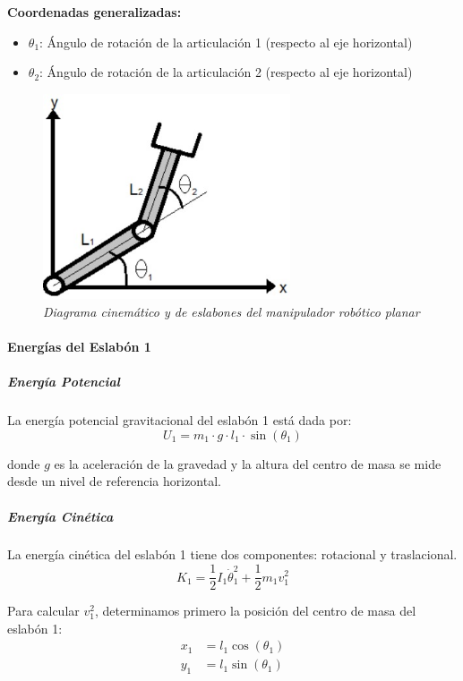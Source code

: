 \textbf{Coordenadas generalizadas:}
\begin{itemize}
    \item $\theta_1$: Ángulo de rotación de la articulación 1 (respecto al eje horizontal)
    \item $\theta_2$: Ángulo de rotación de la articulación 2 (respecto al eje horizontal)
\end{itemize}
\begin{figure}[H]
    \centering
    \includegraphics[width=0.65\textwidth]{img/DCL_brazo.png}
    \caption{\textit{Diagrama cinemático y de eslabones del manipulador robótico planar}}
    \label{fig:DCL_brazo}
\end{figure}
\paragraph{Energías del Eslabón 1}

\subparagraph{Energía Potencial}

La energía potencial gravitacional del eslabón 1 está dada por:
\begin{equation}
U_1 = m_1 \cdot g \cdot l_1 \cdot \sin(\theta_1)
\end{equation}

donde $g$ es la aceleración de la gravedad y la altura del centro de masa se mide desde un nivel de referencia horizontal.

\subparagraph{Energía Cinética}

La energía cinética del eslabón 1 tiene dos componentes: rotacional y traslacional.
\begin{equation}
K_1 = \frac{1}{2} I_1 \dot{\theta}_1^2 + \frac{1}{2} m_1 v_1^2
\end{equation}

Para calcular $v_1^2$, determinamos primero la posición del centro de masa del eslabón 1:
\begin{align}
x_1 &= l_1 \cos(\theta_1) \\
y_1 &= l_1 \sin(\theta_1)
\end{align}

